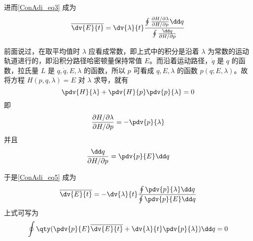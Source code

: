 进而\autoref{ConAdi_eq3} 成为
\begin{equation}\label{ConAdi_eq5}
\overline{\dv{E}{t}}=\dv{\lambda}{t}
\frac{\oint\frac{\partial{H}/\partial{\lambda}}{\partial{H}/\partial{p}}\dd q}
{\oint\frac{\dd q}{\partial{H}/\partial{p}}}
\end{equation}

前面说过，在取平均值时 $\lambda$ 应看成常数，即上式中的积分是沿着 $\lambda$ 为常数的运动轨道进行的，即沿积分路径哈密顿量保持常值 $E$。而沿着运动路径，$\dot q$ 是 $q$ 的函数，拉氏量 $L$ 是 $q,\dot q,E,\lambda$ 的函数，所以 $p$ 可看成 $q,E,\lambda$ 的函数 $p(q;E,\lambda)$。故将方程 $H(p,q,\lambda)=E$ 对 $\lambda$ 求导，就有
\begin{equation}
\pdv{H}{\lambda}+\pdv{H}{p}\pdv{p}{\lambda}=0
\end{equation}
即 
\begin{equation}
\frac{\partial{H}/\partial{\lambda}}{\partial{H}/\partial{p}}=-\pdv{p}{\lambda}
\end{equation}
并且
\begin{equation}
\frac{\dd q}{\partial{H}/\partial{p}}=\pdv{p}{E}\dd q
\end{equation}

于是\autoref{ConAdi_eq5} 成为
\begin{equation}
\overline{\dv{E}{t}}=-\dv{\lambda}{t}
\frac{\oint\pdv{p}{\lambda}\dd q}
{\oint\pdv{p}{E}\dd q}
\end{equation}
上式可写为
\begin{equation}
\oint\qty(\pdv{p}{E}\overline{\dv{E}{t}}+\dv{\lambda}{t}\pdv{p}{\lambda})\dd q=0
\end{equation}
